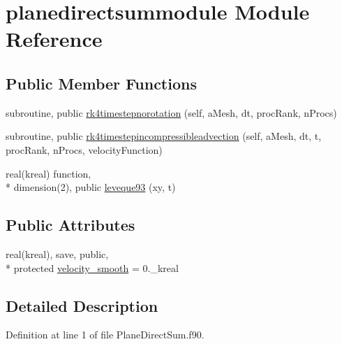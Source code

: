 \hypertarget{classplanedirectsummodule}{\section{planedirectsummodule Module Reference}
\label{classplanedirectsummodule}
}
\subsection*{Public Member Functions}
\begin{DoxyCompactItemize}
\item 
subroutine, public \hyperlink{classplanedirectsummodule_a2bf00997645e24b8cd75fbdbc7c6cd2e}{rk4timestepnorotation} (self, a\+Mesh, dt, proc\+Rank, n\+Procs)
\item 
subroutine, public \hyperlink{classplanedirectsummodule_aff2006ee7a13ce54962e7dd6ec8e0a3e}{rk4timestepincompressibleadvection} (self, a\+Mesh, dt, t, proc\+Rank, n\+Procs, velocity\+Function)
\item 
real(kreal) function, \\*
dimension(2), public \hyperlink{classplanedirectsummodule_ab094545467c4964297c3040de058b338}{leveque93} (xy, t)
\end{DoxyCompactItemize}
\subsection*{Public Attributes}
\begin{DoxyCompactItemize}
\item 
real(kreal), save, public, \\*
protected \hyperlink{classplanedirectsummodule_a9348d367de092462c7f25b1481991990}{velocity\+\_\+smooth} = 0.\+\_\+kreal
\end{DoxyCompactItemize}


\subsection{Detailed Description}


Definition at line 1 of file Plane\+Direct\+Sum.\+f90.



